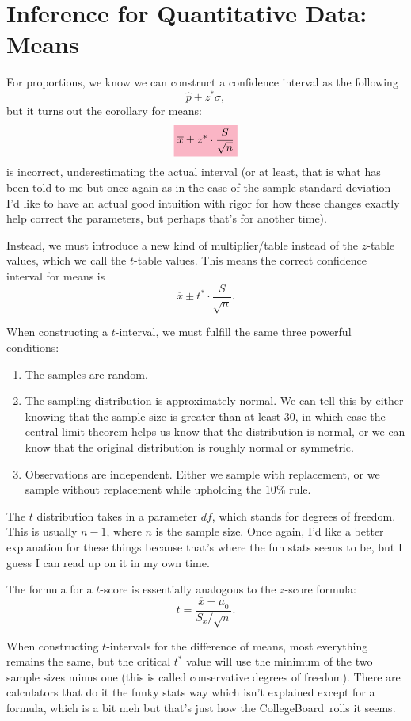 \section{Inference for Quantitative Data: Means}

For proportions, we know we can construct a confidence interval as the following
\[
    \hat{p} \pm z^* \sigma
,\]
but it turns out the corollary for means:
\[
    \colorbox{WildStrawberry!30}{\( \displaystyle \overline{x} \pm z^* \cdot \frac{S}{\sqrt{n}} \)}
\]
is incorrect, underestimating the actual interval (or at least, that is what
has been told to me but once again as in the case of the sample standard
deviation I'd like to have an actual good intuition with rigor for how these
changes exactly help correct the parameters, but perhaps that's for another
time).

Instead, we must introduce a new kind of multiplier/table instead of the \( z
\)-table values, which we call the \( t \)-table values. This means the correct confidence interval for means is
\[
    \overline{x} \pm t^* \cdot \frac{S}{\sqrt{n}}
.\]

When constructing a \( t \)-interval, we must fulfill the same three powerful conditions:
\begin{enumerate}
    \item The samples are random.
    \item The sampling distribution is approximately normal. We can tell this
        by either knowing that the sample size is greater than at least \( 30
        \), in which case the central limit theorem helps us know that the
        distribution is normal, or we can know that the original distribution
        is roughly normal or symmetric.
    \item Observations are independent. Either we sample with replacement, or
        we sample without replacement while upholding the \( 10\% \) rule.
\end{enumerate}

The \( t \) distribution takes in a parameter \( df \), which stands for
degrees of freedom. This is usually \( n - 1 \), where \( n \) is the sample
size. Once again, I'd like a better explanation for these things because that's
where the fun stats seems to be, but I guess I can read up on it in my own
time.

The formula for a \( t \)-score is essentially analogous to the \( z \)-score
formula:
\[
    t = \frac{\overline{x} - \mu_0}{S_x / \sqrt{n}}
.\]

When constructing \( t \)-intervals for the difference of means, most
everything remains the same, but the critical \( t^* \) value will use the
minimum of the two sample sizes minus one (this is called conservative degrees
of freedom). There are calculators that do it the funky stats way which isn't
explained except for a formula, which is a bit meh but that's just how the
CollegeBoard\texttrademark\  rolls it seems.

